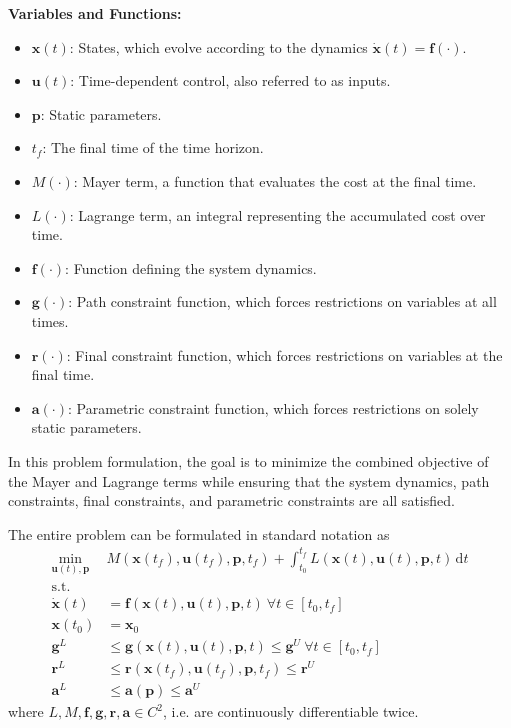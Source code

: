 \documentclass[12pt]{article}
\renewcommand{\v}{\bm}
\begin{document}
\noindent
\textbf{Variables and Functions:}
\begin{itemize}
	\item $\v{x}(t)$: States, which evolve according to the dynamics $\dot{\v{x}}(t) = \v{f}(\cdot)$.
	\item $\v{u}(t)$: Time-dependent control, also referred to as inputs.
	\item $\v{p}$: Static parameters.
	\item $t_f$: The final time of the time horizon.
	\item $M(\cdot)$: Mayer term, a function that evaluates the cost at the final time.
	\item $L(\cdot)$: Lagrange term, an integral representing the accumulated cost over time.
	\item $\v{f}(\cdot)$: Function defining the system dynamics.
	\item $\v{g}(\cdot)$: Path constraint function, which forces restrictions on variables at all times.
	\item $\v{r}(\cdot)$: Final constraint function, which forces restrictions on variables at the final time.
	\item $\v{a}(\cdot)$: Parametric constraint function, which forces restrictions on solely static parameters.
\end{itemize}

In this problem formulation, the goal is to minimize the combined objective of the Mayer and Lagrange terms while ensuring that the system dynamics, path constraints, final constraints, and parametric constraints are all satisfied.

The entire problem can be formulated in standard notation as
\begin{align*}
	\min_{\v{u}(t), \v{p}} ~ & M(\v{x}(t_f), \v{u}(t_f),
	\v{p}, t_f) + \int_{t_0}^{t_f} L(\v{x}(t), \v{u}(t), \v{p}, t)
	\, \mathrm{d}t
	\\
	\text{s.t.}              &
	\\
	\dot{\v{x}}(t)           & = \v{f}(\v{x}(t), \v{u}(t), \v{p},
	t)\
	\forall t \in [t_0, t_f]
	\\
	\v{x}(t_0)               & = \v{x}_0
	\\
	\v{g}^{L}                & \leq \v{g}(\v{x}(t), \v{u}(t),
	\v{p}, t)
	\leq \v{g}^{U}\ \forall t \in [t_0, t_f]
	\\
	\v{r}^{L}                & \leq \v{r}(\v{x}(t_f), \v{u}(t_f),
	\v{p},
	t_f) \leq \v{r}^{U}
	\\
	\v{a}^{L}                & \leq \v{a}(\v{p}) \leq \v{a}^{U}
\end{align*}
where $L, M, \v{f}, \v{g}, \v{r}, \v{a} \in C^2$, i.e. are continuously differentiable twice.
\end{document}
